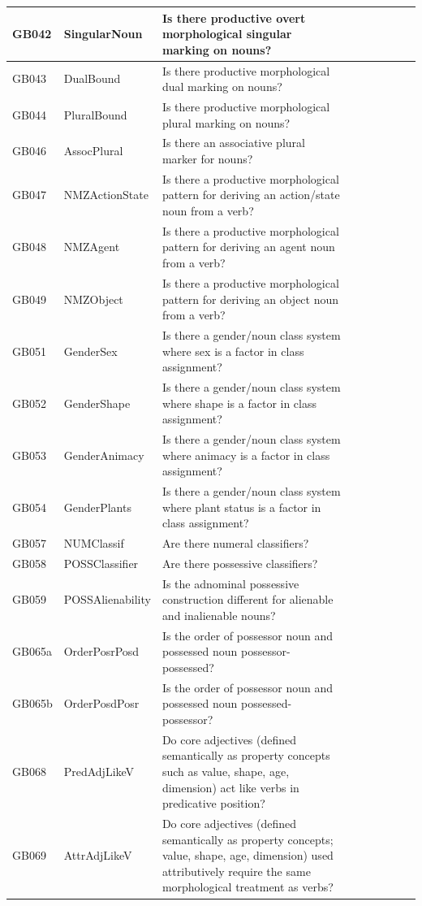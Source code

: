 \documentclass[draft,10pt]{article} %
\begin{document}
\begin{landscape}
\begin{longtable}{| l | p{4cm}| p{12cm}|p{2cm}|p{2cm}|p{2cm}|p{2cm}|p{2cm}|p{2cm}|}
GB042 & SingularNoun&Is there productive overt morphological singular marking on nouns?\\ \hline
GB043 & DualBound&Is there productive morphological dual marking on nouns?\\ \hline
GB044 & PluralBound&Is there productive morphological plural marking on nouns?\\ \hline
GB046 & AssocPlural&Is there an associative plural marker for nouns?\\ \hline
GB047 & NMZActionState&Is there a productive morphological pattern for deriving an action/state noun from a verb?\\ \hline
GB048 & NMZAgent&Is there a productive morphological pattern for deriving an agent noun from a verb?\\ \hline
GB049 & NMZObject&Is there a productive morphological pattern for deriving an object noun from a verb?\\ \hline
GB051 & GenderSex&Is there a gender/noun class system where sex is a factor in class assignment?\\ \hline
GB052 & GenderShape&Is there a gender/noun class system where shape is a factor in class assignment?\\ \hline
GB053 & GenderAnimacy&Is there a gender/noun class system where animacy is a factor in class assignment?\\ \hline
GB054 & GenderPlants&Is there a gender/noun class system where plant status is a factor in class assignment?\\ \hline
GB057 & NUMClassif&Are there numeral classifiers?\\ \hline
GB058 & POSSClassifier&Are there possessive classifiers?\\ \hline
GB059 & POSSAlienability&Is the adnominal possessive construction different for alienable and inalienable nouns?\\ \hline
GB065a & OrderPosrPosd&Is the order of possessor noun and possessed noun possessor-possessed?\\ \hline
GB065b & OrderPosdPosr&Is the order of possessor noun and possessed noun possessed-possessor?\\ \hline
GB068 & PredAdjLikeV&Do core adjectives (defined semantically as property concepts such as value, shape, age, dimension) act like verbs in predicative position?\\ \hline
GB069 & AttrAdjLikeV&Do core adjectives (defined semantically as property concepts; value, shape, age, dimension) used attributively require the same morphological treatment as verbs?\\ \hline

\end{longtable}
\end{landscape}
\end{document}
